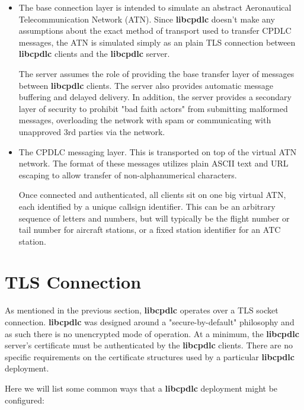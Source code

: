 \documentclass[a4paper,12pt]{article}
\newcommand{\libcpdlc}{\textbf{libcpdlc}\xspace}
\begin{document}
\begin{itemize}

\item The base connection layer is intended to simulate an abstract
Aeronautical Telecommunication Network (ATN). Since \libcpdlc doesn't
make any assumptions about the exact method of transport used to transfer
CPDLC messages, the ATN is simulated simply as an plain TLS connection
between \libcpdlc clients and the \libcpdlc server.

The server assumes the role of providing the base transfer layer of
messages between \libcpdlc clients. The server also provides automatic
message buffering and delayed delivery. In addition, the server provides
a secondary layer of security to prohibit "bad faith actors" from
submitting malformed messages, overloading the network with spam or
communicating with unapproved 3rd parties via the network.

\item The CPDLC messaging layer. This is transported on top of the
virtual ATN network. The format of these messages utilizes plain ASCII
text and URL escaping to allow transfer of non-alphanumerical characters.

Once connected and authenticated, all clients sit on one big virtual ATN,
each identified by a unique callsign identifier. This can be an arbitrary
sequence of letters and numbers, but will typically be the flight number
or tail number for aircraft stations, or a fixed station identifier for
an ATC station.

\end{itemize}

\newpage

\section{TLS Connection}

As mentioned in the previous section, \libcpdlc operates over a TLS
socket connection. \libcpdlc was designed around a "secure-by-default"
philosophy and as such there is no unencrypted mode of operation. At a
minimum, the \libcpdlc server's certificate must be authenticated by the
\libcpdlc clients. There are no specific requirements on the certificate
structures used by a particular \libcpdlc deployment.

\noindent Here we will list some common ways that a \libcpdlc deployment
might be configured:
\end{document}
